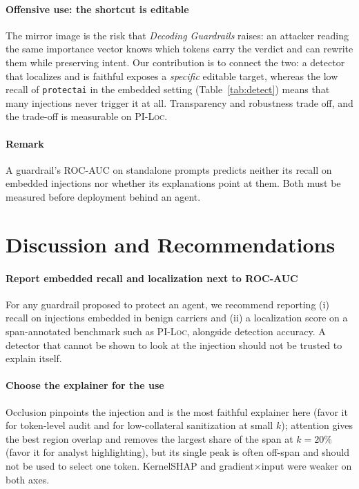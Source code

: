 \documentclass{ieeeaccess}
\begin{document}
\paragraph*{Offensive use: the shortcut is editable}
The mirror image is the risk that \emph{Decoding Guardrails} \cite{decodingguardrails} raises: an attacker reading the same importance vector knows which tokens carry the verdict and can rewrite them while preserving intent. Our contribution is to connect the two: a detector that localizes and is faithful exposes a \emph{specific} editable target, whereas the low recall of \texttt{protectai} in the embedded setting (Table~\ref{tab:detect}) means that many injections never trigger it at all. Transparency and robustness trade off, and the trade-off is measurable on \textsc{PI-Loc}.

\paragraph*{Remark}
A guardrail's ROC-AUC on standalone prompts predicts neither its recall on embedded injections nor whether its explanations point at them. Both must be measured before deployment behind an agent.

\section{Discussion and Recommendations}
\label{sec:disc}

\paragraph*{Report embedded recall and localization next to ROC-AUC}
For any guardrail proposed to protect an agent, we recommend reporting (i) recall on injections embedded in benign carriers and (ii) a localization score on a span-annotated benchmark such as \textsc{PI-Loc}, alongside detection accuracy. A detector that cannot be shown to look at the injection should not be trusted to explain itself.

\paragraph*{Choose the explainer for the use}
Occlusion pinpoints the injection and is the most faithful explainer here (favor it for token-level audit and for low-collateral sanitization at small $k$); attention gives the best region overlap and removes the largest share of the span at $k{=}20\%$ (favor it for analyst highlighting), but its single peak is often off-span and should not be used to select one token. KernelSHAP and gradient$\times$input were weaker on both axes.
\end{document}
